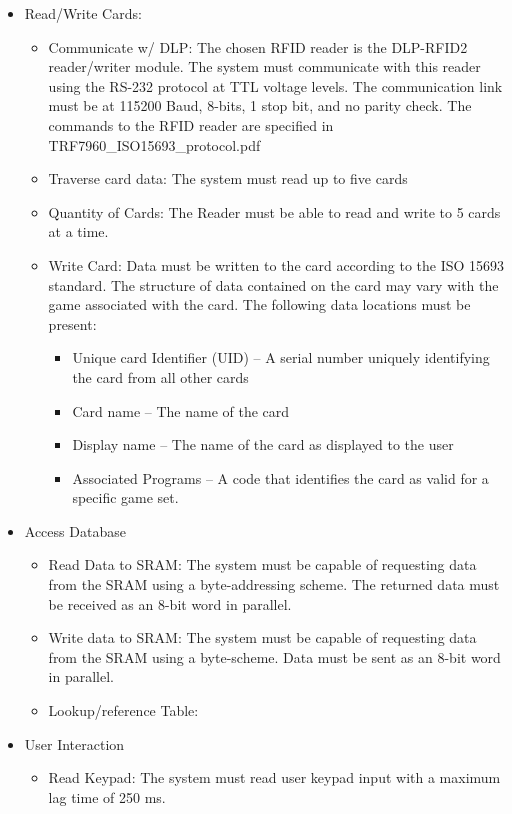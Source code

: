 \documentclass[12pt]{article} %
\begin{document}
\begin{itemize}
	\item Read/Write Cards: 
		\begin{itemize}
			\item Communicate w/ DLP: The chosen RFID reader is the DLP-RFID2 reader/writer module. The system must communicate with this reader using the RS-232 protocol at TTL voltage levels. The communication link must be at 115200 Baud, 8-bits, 1 stop bit, and no parity check. The commands to the RFID reader are specified in TRF7960\_ISO15693\_protocol.pdf 
			\item Traverse card data: The system must read up to five cards
			\item Quantity of Cards: The Reader must be able to read and write to 5 cards at a time.
			\item Write Card: Data must be written to the card according to the ISO 15693 standard. The structure of data contained on the card may vary with the game associated with the card. The following data locations must be present:
				\begin{itemize}
					\item Unique card Identifier (UID) – A serial number uniquely identifying the card from all other cards
					\item Card name – The name of the card
					\item Display name – The name of the card as displayed to the user
					\item Associated Programs – A code that identifies the card as valid for a specific game set.
				\end{itemize}
		\end{itemize}
	\item Access Database
		\begin{itemize}
			\item Read Data to SRAM: The system must be capable of requesting data from the SRAM using a byte-addressing scheme. The returned data must be received as an 8-bit word in parallel.
			\item Write data to SRAM: The system must be capable of requesting data from the SRAM using a byte-scheme. Data must be sent as an 8-bit word in parallel.
			\item Lookup/reference Table:
		\end{itemize}
	\item User Interaction
		\begin{itemize}
			\item Read Keypad: The system must read user keypad input with a maximum lag time of 250 ms.  

\end{itemize}
\end{itemize}
\end{document}
